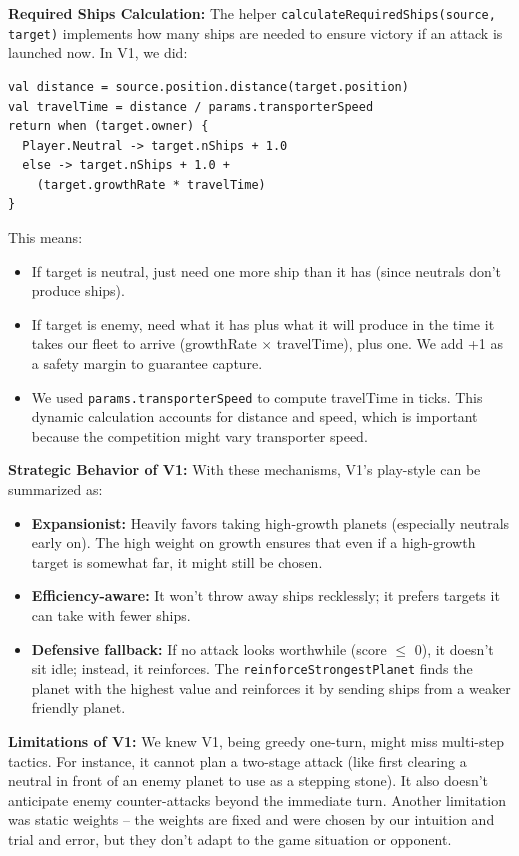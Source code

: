 \documentclass[conference]{IEEEtran}
\begin{document}
\textbf{Required Ships Calculation:} The helper \texttt{calculateRequiredShips(source, target)} implements how many ships are needed to ensure victory if an attack is launched now. In V1, we did:

\begin{scriptsize}
\raggedright
\begin{verbatim}
val distance = source.position.distance(target.position)
val travelTime = distance / params.transporterSpeed
return when (target.owner) {
  Player.Neutral -> target.nShips + 1.0
  else -> target.nShips + 1.0 + 
    (target.growthRate * travelTime)
}
\end{verbatim}
\end{scriptsize}

This means:
\begin{itemize}
\item If target is neutral, just need one more ship than it has (since neutrals don't produce ships).
\item If target is enemy, need what it has plus what it will produce in the time it takes our fleet to arrive (growthRate $\times$ travelTime), plus one. We add +1 as a safety margin to guarantee capture.
\item We used \texttt{params.transporterSpeed} to compute travelTime in ticks. This dynamic calculation accounts for distance and speed, which is important because the competition might vary transporter speed.
\end{itemize}

\textbf{Strategic Behavior of V1:} With these mechanisms, V1's play-style can be summarized as:

\begin{itemize}
\item \textbf{Expansionist:} Heavily favors taking high-growth planets (especially neutrals early on). The high weight on growth ensures that even if a high-growth target is somewhat far, it might still be chosen.
\item \textbf{Efficiency-aware:} It won't throw away ships recklessly; it prefers targets it can take with fewer ships.
\item \textbf{Defensive fallback:} If no attack looks worthwhile (score $\leq$ 0), it doesn't sit idle; instead, it reinforces. The \texttt{reinforceStrongestPlanet} finds the planet with the highest value and reinforces it by sending ships from a weaker friendly planet.
\end{itemize}

\textbf{Limitations of V1:} We knew V1, being greedy one-turn, might miss multi-step tactics. For instance, it cannot plan a two-stage attack (like first clearing a neutral in front of an enemy planet to use as a stepping stone). It also doesn't anticipate enemy counter-attacks beyond the immediate turn. Another limitation was static weights -- the weights are fixed and were chosen by our intuition and trial and error, but they don't adapt to the game situation or opponent.
\end{document}
